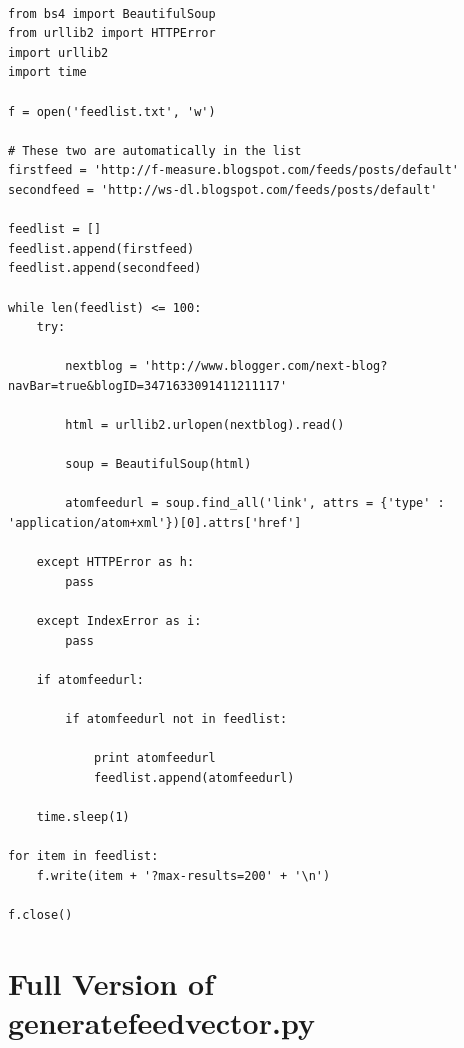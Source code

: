 \documentclass{article}
\begin{document}
\begin{lstlisting}[frame=single, caption=getFeedList.py, label=getFeedList]

from bs4 import BeautifulSoup
from urllib2 import HTTPError
import urllib2
import time

f = open('feedlist.txt', 'w')

# These two are automatically in the list
firstfeed = 'http://f-measure.blogspot.com/feeds/posts/default'
secondfeed = 'http://ws-dl.blogspot.com/feeds/posts/default'

feedlist = []
feedlist.append(firstfeed)
feedlist.append(secondfeed)

while len(feedlist) <= 100:
    try:

        nextblog = 'http://www.blogger.com/next-blog?navBar=true&blogID=3471633091411211117'

        html = urllib2.urlopen(nextblog).read()

        soup = BeautifulSoup(html)

        atomfeedurl = soup.find_all('link', attrs = {'type' : 'application/atom+xml'})[0].attrs['href']

    except HTTPError as h:
        pass

    except IndexError as i:
        pass

    if atomfeedurl:

        if atomfeedurl not in feedlist:

            print atomfeedurl
            feedlist.append(atomfeedurl)

    time.sleep(1)

for item in feedlist:
    f.write(item + '?max-results=200' + '\n')

f.close()

\end{lstlisting}

\section{Full Version of generatefeedvector.py}
\end{document}
